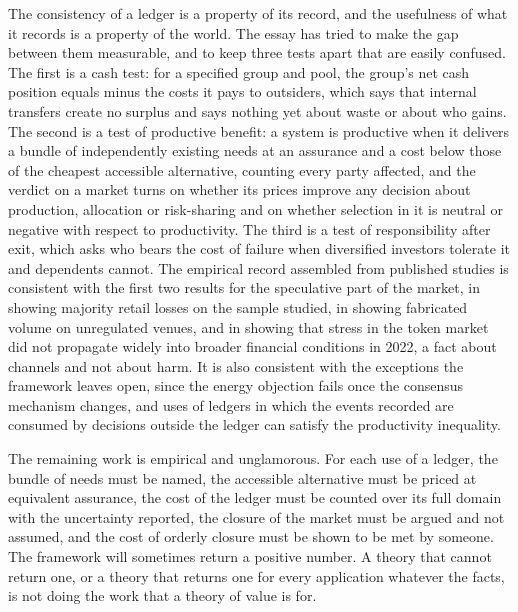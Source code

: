 \documentclass[11pt]{article}
\theoremstyle{remark}
\begin{document}
The consistency of a ledger is a property of its record, and the usefulness of what it records is a property of the world. The essay has tried to make the gap between them measurable, and to keep three tests apart that are easily confused. The first is a cash test: for a specified group and pool, the group's net cash position equals minus the costs it pays to outsiders, which says that internal transfers create no surplus and says nothing yet about waste or about who gains. The second is a test of productive benefit: a system is productive when it delivers a bundle of independently existing needs at an assurance and a cost below those of the cheapest accessible alternative, counting every party affected, and the verdict on a market turns on whether its prices improve any decision about production, allocation or risk-sharing and on whether selection in it is neutral or negative with respect to productivity. The third is a test of responsibility after exit, which asks who bears the cost of failure when diversified investors tolerate it and dependents cannot. The empirical record assembled from published studies is consistent with the first two results for the speculative part of the market, in showing majority retail losses on the sample studied, in showing fabricated volume on unregulated venues, and in showing that stress in the token market did not propagate widely into broader financial conditions in 2022, a fact about channels and not about harm. It is also consistent with the exceptions the framework leaves open, since the energy objection fails once the consensus mechanism changes, and uses of ledgers in which the events recorded are consumed by decisions outside the ledger can satisfy the productivity inequality.

The remaining work is empirical and unglamorous. For each use of a ledger, the bundle of needs must be named, the accessible alternative must be priced at equivalent assurance, the cost of the ledger must be counted over its full domain with the uncertainty reported, the closure of the market must be argued and not assumed, and the cost of orderly closure must be shown to be met by someone. The framework will sometimes return a positive number. A theory that cannot return one, or a theory that returns one for every application whatever the facts, is not doing the work that a theory of value is for.
\end{document}
